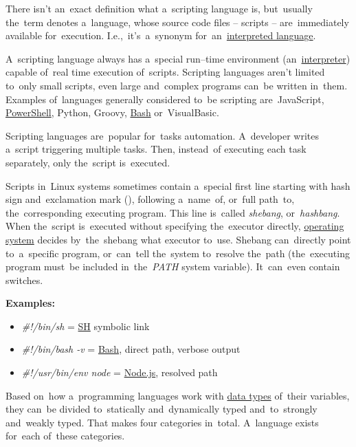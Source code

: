 \label{scriptinglanguages}
There isn't an~exact definition what a~scripting language is, but~usually the~term denotes a~language, whose source code files -- scripts -- are~immediately available for~execution.
I.e.,~it's~a~synonym for~an~\hyperref[compiledinterpretedlanguages]{interpreted language}.

A~scripting language always has a~special run--time environment (an~\hyperref[compiledinterpretedlanguages]{interpreter}) capable of~real time execution of~scripts.
Scripting languages aren't limited to~only small scripts, even large and~complex programs can~be written in~them.
Examples of~languages generally considered to~be scripting are~JavaScript, \hyperref[powershell]{PowerShell}, Python, Groovy, \hyperref[shbash]{Bash} or~VisualBasic.

Scripting languages are~popular for~tasks automation.
A~developer writes a~script triggering multiple tasks.
Then, instead~of executing each task separately, only the~script is~executed.

\label{shebang}
Scripts in~Linux systems sometimes contain a~special first line starting with hash sign and~exclamation mark (\itq{\#!}), following a~name~of, or~full path~to, the~corresponding executing program.
This line is~called \textit{shebang}, or~\textit{hashbang}.
When the~script is~executed without specifying the~executor directly, \hyperref[os]{operating system} decides by~the~shebang what executor to~use.
Shebang can~directly point to~a~specific program, or~can~tell the~system to~resolve the~path (the~executing program must~be included in~the~\textit{PATH} system variable).
It~can~even contain switches.
\newline

\noindent \textbf{Examples:}
\begin{itemize}
    \item \textit{\#!/bin/sh} = \hyperref[shbash]{SH} symbolic link
    \item \textit{\#!/bin/bash -v} = \hyperref[shbash]{Bash}, direct path, verbose output
    \item \textit{\#!/usr/bin/env node} = \hyperref[nodejs]{Node.js}, resolved path
\end{itemize}

Based on~how a~programming languages work with \hyperref[datatypes]{data types} of~their variables, they can~be divided to~statically and~dynamically typed and~to~strongly and~weakly typed.
That makes four categories in~total.
A~language exists for~each of~these categories.

